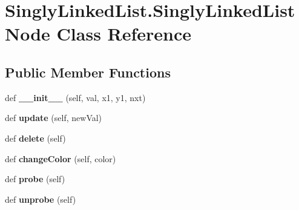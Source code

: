 \hypertarget{class_singly_linked_list_1_1_singly_linked_list_node}{}\section{Singly\+Linked\+List.\+Singly\+Linked\+List\+Node Class Reference}
\label{class_singly_linked_list_1_1_singly_linked_list_node}
\subsection*{Public Member Functions}
\begin{DoxyCompactItemize}
\item 
\mbox{\label{class_singly_linked_list_1_1_singly_linked_list_node_a7dc5e943f0780eb94e10a3e127e9981e}} 
def {\bfseries \+\_\+\+\_\+init\+\_\+\+\_\+} (self, val, x1, y1, nxt)
\item 
\mbox{\label{class_singly_linked_list_1_1_singly_linked_list_node_aa68f8ef3332faaa7d105f0ee6a26537f}} 
def {\bfseries update} (self, new\+Val)
\item 
\mbox{\label{class_singly_linked_list_1_1_singly_linked_list_node_a0acea59e6b0d5b52205ebdedcba44d31}} 
def {\bfseries delete} (self)
\item 
\mbox{\label{class_singly_linked_list_1_1_singly_linked_list_node_a0b8e7f821c47733bed23ba4acca433ce}} 
def {\bfseries change\+Color} (self, color)
\item 
\mbox{\label{class_singly_linked_list_1_1_singly_linked_list_node_acef058b54a5cc6cce223cdad32d0e546}} 
def {\bfseries probe} (self)
\item 
\mbox{\label{class_singly_linked_list_1_1_singly_linked_list_node_a8c96a79dc1f27ca37ab82dcd80bcac51}} 
def {\bfseries unprobe} (self)
\item 
\mbox{\label{class_singly_linked_list_1_1_singly_linked_list_node_a93b77e8258a5fc14305a11ba27eab8f3}} 

\end{DoxyCompactItemize}
